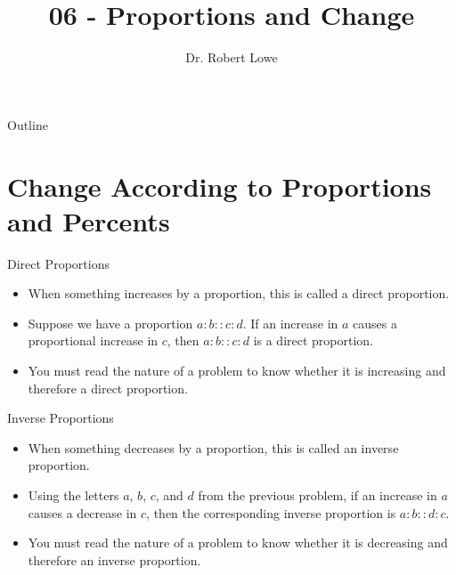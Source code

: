 \documentclass[]{beamer}
\title{06 - Proportions and Change}
\author{Dr. Robert Lowe\\}
\institute[Maryville College] %
{
  Division of Mathematics and Computer Science\\
  Maryville College
}
\date[]{}
\begin{document}
\begin{frame}
  \titlepage
\end{frame}

\begin{frame}{Outline}
  \tableofcontents
\end{frame}





\section{Change According to Proportions and Percents}
\begin{frame}{Direct Proportions}
\begin{itemize}[<+->]
    \item When something increases by a proportion, this is called a direct proportion.
    \item Suppose we have a proportion $a:b :: c:d$.  If an increase in $a$ causes a proportional increase in $c$, then $a:b :: c:d$ is a direct proportion.  
    \item You must read the nature of a problem to know whether it is increasing and therefore a direct proportion.
\end{itemize}
\end{frame}

\begin{frame}{Inverse Proportions}
\begin{itemize}[<+->]
    \item When something decreases by a proportion, this is called an inverse proportion.
    \item Using the letters $a$, $b$, $c$, and $d$ from the previous problem, if an increase in $a$ causes a decrease in $c$, then the corresponding inverse proportion is $a:b :: d:c$.
    \item You must read the nature of a problem to know whether it is decreasing and therefore an inverse proportion.
\end{itemize}
\end{frame}
\end{document}
